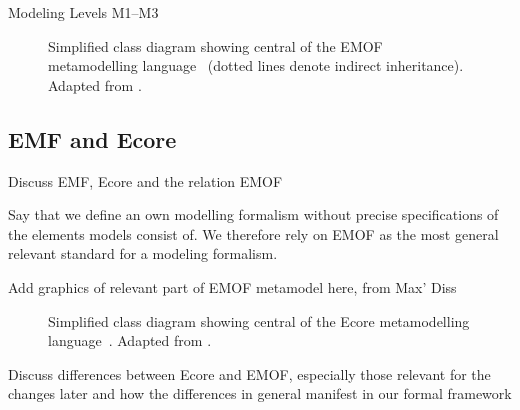 Modeling Levels M1--M3

\begin{figure}
    \centering
    
    \caption[Simplified EMOF metamodelling language]{Simplified class diagram showing central \metaclasses of the EMOF metamodelling language~\cite[p. 27]{mof} (dotted lines denote indirect inheritance). Adapted from \cite[Fig. 2.2]{kramer2017a}.}
    \label{fig:foundations:emof}
\end{figure}

\subsection{EMF and Ecore}
\label{chap:foundations:formalisms:ecore}
Discuss \gls{EMF}, Ecore and the relation EMOF

Say that we define an own modelling formalism without precise specifications of the elements models consist of. We therefore rely on EMOF as the most general relevant standard for a modeling formalism.

Add graphics of relevant part of EMOF metamodel here, from Max' Diss

\begin{figure}
    \centering
    
    \caption[Simplified Ecore metamodelling language]{Simplified class diagram showing central \metaclasses of the Ecore metamodelling language~\cite[p. 97]{steinberg2009emf}. Adapted from \cite[Fig. 2.3]{kramer2017a}.}
    \label{fig:foundations:ecore}
\end{figure}


\label{chap:foundations:formalisms:differences}

Discuss differences between Ecore and EMOF, especially those relevant for the changes later and how the differences in general manifest in our formal framework

